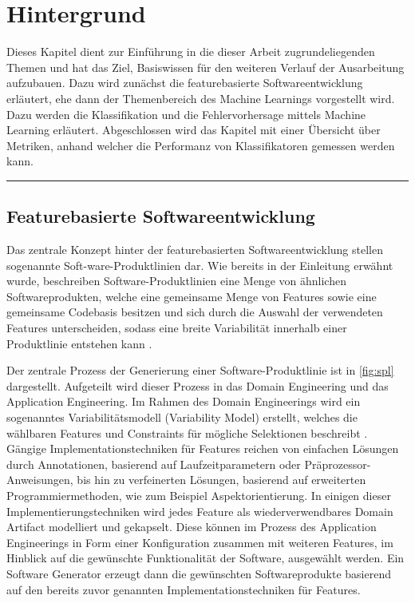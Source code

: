 
\chapter{Hintergrund}
\label{background}

Dieses Kapitel dient zur Einführung in die dieser Arbeit zugrundeliegenden Themen und hat das Ziel, Basiswissen für den weiteren Verlauf der Ausarbeitung aufzubauen. Dazu wird zunächst die featurebasierte Softwareentwicklung erläutert, ehe dann der Themenbereich des Machine Learnings vorgestellt wird. Dazu werden die Klassifikation und die Fehlervorhersage mittels Machine Learning erläutert. Abgeschlossen wird das Kapitel mit einer Übersicht über Metriken, anhand welcher die Performanz von Klassifikatoren gemessen werden kann.
\smallskip
\hrule

\section{Featurebasierte Softwareentwicklung}
\label{feat-develop}

Das zentrale Konzept hinter der featurebasierten Softwareentwicklung stellen sogenannte Soft-ware-Produktlinien dar. Wie bereits in der Einleitung erwähnt wurde, beschreiben Software-Produktlinien eine Menge von ähnlichen Softwareprodukten, welche eine gemeinsame Menge von Features sowie eine gemeinsame Codebasis besitzen und sich durch die Auswahl der verwendeten Features unterscheiden, sodass eine breite Variabilität innerhalb einer Produktlinie entstehen kann \cite{Apel2013,Thuem2014}.

Der zentrale Prozess der Generierung einer Software-Produktlinie ist in \autoref{fig:spl} dargestellt. Aufgeteilt wird dieser Prozess in das \glqq Domain Engineering\grqq{} und das \glqq Application Engineering\grqq{}. Im Rahmen des \glqq Domain Engineerings\grqq{} wird ein sogenanntes Variabilitätsmodell (Variability Model) erstellt, welches die wählbaren Features und Constraints für mögliche Selektionen beschreibt \cite{Apel2013}. Gängige Implementationstechniken für Features reichen von einfachen Lösungen durch Annotationen, basierend auf Laufzeitparametern oder Präprozessor-Anweisungen, bis hin zu verfeinerten Lösungen, basierend auf erweiterten Programmiermethoden, wie zum Beispiel Aspektorientierung. In einigen dieser Implementierungstechniken wird jedes Feature als wiederverwendbares \glqq Domain Artifact\grqq{} modelliert und gekapselt. Diese können im Prozess des \glqq Application Engineerings\grqq{} in Form einer Konfiguration zusammen mit weiteren Features, im Hinblick auf die gewünschte Funktionalität der Software, ausgewählt werden. Ein Software Generator erzeugt dann die gewünschten Softwareprodukte basierend auf den bereits zuvor genannten Implementationstechniken für Features.

